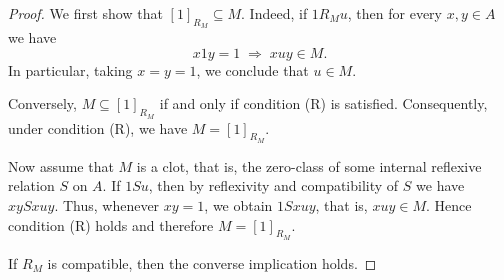 \documentclass[10pt,a4paper]{amsart}
\begin{document}
\begin{proof}
We first show that $[1]_{R_M} \subseteq M$. Indeed, if $1 R_M u$, then for every $x,y\in A$ we have
\[
x1y = 1 \;\Rightarrow\; xuy \in M.
\]
In particular, taking $x=y=1$, we conclude that $u\in M$.

Conversely, $M \subseteq [1]_{R_M}$ if and only if condition (R) is satisfied. Consequently, under condition (R), we have
$M = [1]_{R_M}$.

Now assume that $M$ is a clot, that is, the zero-class of some internal reflexive relation $S$ on $A$. If $1Su$, then by reflexivity and compatibility of $S$ we have $xySxuy$. Thus, whenever $xy=1$, we obtain $1Sxuy$, that is, $xuy\in M$. Hence condition (R) holds and therefore $M=[1]_{R_M}$.

If $R_M$ is compatible, then the converse implication holds.
\end{proof}
\end{document}
